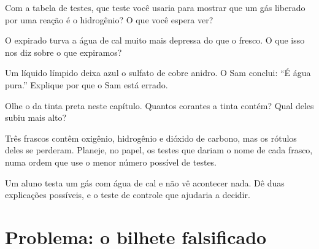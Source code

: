 \begin{exercise}[$\star\star$]\label{exo:g7:identifying-substances:7}
Com a tabela de testes, que teste você usaria para mostrar que um gás
liberado por uma reação é o hidrogênio? O que você espera ver?
\end{exercise}

\begin{exercise}[$\star\star$]\label{exo:g7:identifying-substances:8}
O  expirado turva a água de cal muito mais depressa do que o 
fresco. O que isso nos diz sobre o  que expiramos?
\end{exercise}

\begin{exercise}[$\star\star$]\label{exo:g7:identifying-substances:9}
Um líquido límpido deixa azul o sulfato de cobre anidro. O Sam conclui:
``É água pura.'' Explique por que o Sam está errado.
\end{exercise}

\begin{exercise}[$\star\star$]\label{exo:g7:identifying-substances:10}
Olhe o  da tinta preta neste capítulo. Quantos corantes a
tinta contém? Qual deles subiu mais alto?
\end{exercise}

\begin{exercise}[$\star\star\star$]\label{exo:g7:identifying-substances:11}
Três frascos contêm oxigênio, hidrogênio e dióxido de carbono, mas os
rótulos deles se perderam. Planeje, no papel, os testes que dariam o
nome de cada frasco, numa ordem que use o menor número possível de
testes.
\end{exercise}

\begin{exercise}[$\star\star\star$]\label{exo:g7:identifying-substances:12}
Um aluno testa um gás com água de cal e não vê acontecer nada. Dê duas
explicações possíveis, e o teste de controle que ajudaria a decidir.
\end{exercise}

\section{Problema: o bilhete falsificado}

